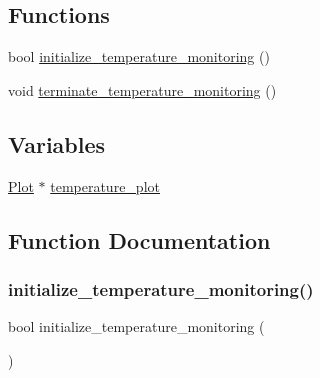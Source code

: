 \subsection*{Functions}
\begin{DoxyCompactItemize}
\item 
bool \hyperlink{temperature-monitoring_8h_a1d2bab81a3e6aa84eb0c2e0172594299}{initialize\+\_\+temperature\+\_\+monitoring} ()
\item 
void \hyperlink{temperature-monitoring_8h_a8b1be00dadac2a3d808233430fb2cf8b}{terminate\+\_\+temperature\+\_\+monitoring} ()
\end{DoxyCompactItemize}
\subsection*{Variables}
\begin{DoxyCompactItemize}
\item 
\hyperlink{structPlot}{Plot} $\ast$ \hyperlink{temperature-monitoring_8h_a54a4a2add118156b66234393348c169d}{temperature\+\_\+plot}
\end{DoxyCompactItemize}


\subsection{Function Documentation}
\mbox{\label{temperature-monitoring_8h_a1d2bab81a3e6aa84eb0c2e0172594299}} 
\subsubsection{\texorpdfstring{initialize\+\_\+temperature\+\_\+monitoring()}{initialize\_temperature\_monitoring()}}
{\footnotesize\ttfamily bool initialize\+\_\+temperature\+\_\+monitoring (\begin{DoxyParamCaption}{ }\end{DoxyParamCaption})}

